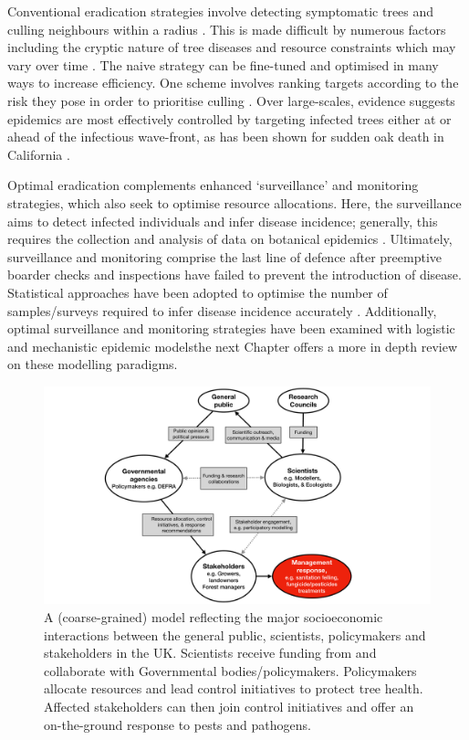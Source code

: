Conventional eradication strategies involve detecting symptomatic trees and culling neighbours within a radius \cite{WEBIDEMICS}.
This is made difficult by numerous factors including the cryptic nature of tree diseases and resource constraints which may vary
over time \cite{control-theory, control-theory-application}. The naive strategy can be fine-tuned and optimised in many ways to increase
efficiency. One scheme involves ranking targets according to the risk they pose in order to prioritise culling \cite{risk-potential-control}.
Over large-scales, evidence suggests epidemics are most effectively controlled by targeting infected trees either at or ahead of
the infectious wave-front, as has been shown for sudden oak death in California \cite{large-scale-control}.


Optimal eradication complements enhanced `surveillance' and monitoring strategies, 
which also seek to optimise resource allocations. Here, the surveillance aims to detect infected individuals and infer disease incidence;
generally, this requires the collection and analysis of data on botanical epidemics \cite{surveillance-review}.
Ultimately, surveillance and monitoring comprise the last line of defence after preemptive boarder 
checks and inspections have failed to prevent the introduction of disease. 
Statistical approaches have been adopted to optimise the number of samples/surveys required to infer disease incidence accurately \cite{yamamura2016sampling}.
Additionally, optimal surveillance and monitoring strategies have been examined with logistic \cite{parnell2012estimating} 
and mechanistic \cite{risk-potential-control} epidemic models\textemdash the next Chapter offers a more in depth review on these modelling paradigms.

\begin{figure}
    \centering
    \includegraphics[scale=0.35]{chapter1/figures/modelling-and-policy.pdf}
    \caption{A (coarse-grained) model reflecting the major socioeconomic interactions between the general public, scientists, 
    policymakers and stakeholders in the UK. Scientists receive funding from and collaborate with Governmental bodies/policymakers. 
    Policymakers allocate resources and lead control initiatives to protect tree health. 
    Affected stakeholders can then join control initiatives and offer an on-the-ground response to pests and pathogens.}
    \label{fig:modelling-and-policies}
\end{figure}

